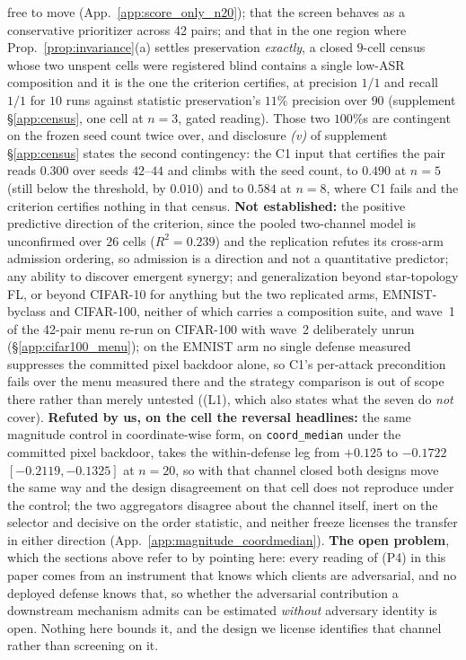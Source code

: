 \documentclass{article}
\begin{document}
free to move (App.~\ref{app:score_only_n20}); that the screen behaves as a conservative prioritizer across 42 pairs; and that in the one region where Prop.~\ref{prop:invariance}(a) settles preservation \emph{exactly}, a closed $9$-cell census whose two unspent cells were registered blind contains a single low-ASR composition and it is the one the criterion certifies, at precision $1/1$ and recall $1/1$ for $10$ runs against statistic preservation's $11\%$ precision over $90$ (supplement §\ref{app:census}, one cell at $n{=}3$, gated reading). Those two $100\%$s are contingent on the frozen seed count twice over, and disclosure \emph{(v)} of supplement §\ref{app:census} states the second contingency: the C1 input that certifies the pair reads $0.300$ over seeds $42$--$44$ and climbs with the seed count, to $0.490$ at $n{=}5$ (still below the threshold, by $0.010$) and to $0.584$ at $n{=}8$, where C1 fails and the criterion certifies nothing in that census. \textbf{Not established:} the positive predictive direction of the criterion, since the pooled two-channel model is unconfirmed over $26$ cells ($R^2{=}0.239$) and the replication refutes its cross-arm admission ordering, so admission is a direction and not a quantitative predictor; any ability to discover emergent synergy; and generalization beyond star-topology FL, or beyond CIFAR-10 for anything but the two replicated arms, EMNIST-byclass and CIFAR-100, neither of which carries a composition suite, and wave~1 of the 42-pair menu re-run on CIFAR-100 with wave~2 deliberately unrun (§\ref{app:cifar100_menu}); on the EMNIST arm no single defense measured suppresses the committed pixel backdoor alone, so C1's per-attack precondition fails over the menu measured there and the strategy comparison is out of scope there rather than merely untested ((L1), which also states what the seven do \emph{not} cover). \textbf{Refuted by us, on the cell the reversal headlines:} the same magnitude control in coordinate-wise form, on \texttt{coord\_median} under the committed pixel backdoor, takes the within-defense leg from $+0.125$ to $-0.1722$ $[-0.2119,-0.1325]$ at $n{=}20$, so with that channel closed both designs move the same way and the design disagreement on that cell does not reproduce under the control; the two aggregators disagree about the channel itself, inert on the selector and decisive on the order statistic, and neither freeze licenses the transfer in either direction (App.~\ref{app:magnitude_coordmedian}). \textbf{The open problem}, which the sections above refer to by pointing here: every reading of (P4) in this paper comes from an instrument that knows which clients are adversarial, and no deployed defense knows that, so whether the adversarial contribution a downstream mechanism admits can be estimated \emph{without} adversary identity is open. Nothing here bounds it, and the design we license identifies that channel rather than screening on it.
\end{document}
